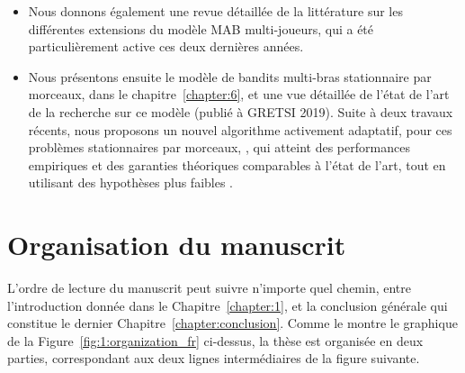 \begin{resume_fr}
\begin{itemize}
    \item
    Nous donnons également une revue détaillée de la littérature sur les différentes extensions du modèle MAB multi-joueurs, qui a été particulièrement active ces deux dernières années.

    \item
    Nous présentons ensuite le modèle de bandits multi-bras stationnaire par morceaux, dans le chapitre~\ref{chapter:6}, et une vue détaillée de l'état de l'art de la recherche sur ce modèle \cite{Besson2019GLRT,Besson2019Gretsi} (publié à GRETSI 2019).
    Suite à deux travaux récents, nous proposons un nouvel algorithme activement adaptatif, pour ces problèmes stationnaires par morceaux, \GLRklUCB, qui atteint des performances empiriques et des garanties théoriques comparables à l'état de l'art, tout en utilisant des hypothèses plus faibles .

\end{itemize}

\section*{Organisation du manuscrit}

%
L'ordre de lecture du manuscrit peut suivre n'importe quel chemin, entre l'introduction donnée dans le Chapitre~\ref{chapter:1}, et la conclusion générale qui constitue le dernier Chapitre~\ref{chapter:conclusion}.
Comme le montre le graphique de la Figure~\ref{fig:1:organization_fr} ci-dessus,
la thèse est organisée en deux parties, correspondant aux deux lignes intermédiaires de la figure suivante.


\end{resume_fr}
